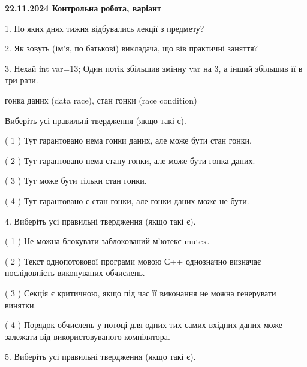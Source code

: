 \documentclass[12pt, ukrainian]{article}
\begin{document}
\vspace{4mm}
\newpage
\begin {large}

\textbf{22.11.2024 Контрольна робота, варіант  }\par


{
1. По яких днях тижня відбувались лекції з предмету?



\vspace{5mm}
2. Як зовуть (ім'я, по батькові) викладача, що вів практичні заняття?



\vspace{5mm}
3. Нехай int var=13; Один потік збільшив змінну var на 3, а інший збільшив її в три рази.

гонка даних (data race), стан гонки (race condition)

Виберіть усі правильні твердження (якщо такі є).\par
\vspace{2mm}
( 1 ) Тут гарантовано нема гонки даних, але може бути стан гонки.%

( 2 ) Тут гарантовано нема стану гонки, але може бути гонка даних.%

( 3 ) Тут може бути тільки стан гонки.%

( 4 ) Тут гарантовано є стан гонки, але гонки даних може не бути.%


\vspace{5mm}
4. Виберіть усі правильні твердження (якщо такі є).\par
\vspace{2mm}

( 1 ) Не можна блокувати заблокований м’ютекс mutex.%

( 2 ) Текст однопотокової програми мовою С++ однозначно визначає послідовність виконуваних обчислень.%

( 3 ) Секція є критичною, якщо під час її виконання не можна генерувати винятки.%

( 4 ) Порядок обчислень у потоці для одних тих самих вхідних даних може залежати від використовуваного компілятора.%


\vspace{5mm}
5. Виберіть усі правильні твердження (якщо такі є).\par
\vspace{2mm}

}
\end{large}
\end{document}
